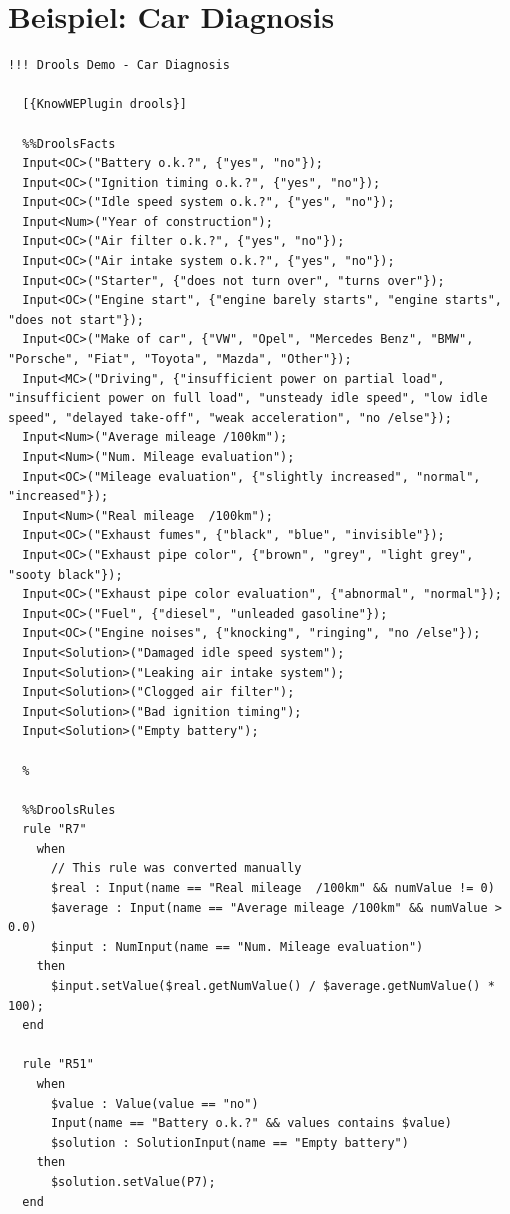 \documentclass[a4paper,12pt]{report}
\begin{document}
  \chapter{Beispiel: Car Diagnosis}
  \begin{lstlisting}[]
  !!! Drools Demo - Car Diagnosis

  [{KnowWEPlugin drools}]

  %%DroolsFacts
  Input<OC>("Battery o.k.?", {"yes", "no"});
  Input<OC>("Ignition timing o.k.?", {"yes", "no"});
  Input<OC>("Idle speed system o.k.?", {"yes", "no"});
  Input<Num>("Year of construction");
  Input<OC>("Air filter o.k.?", {"yes", "no"});
  Input<OC>("Air intake system o.k.?", {"yes", "no"});
  Input<OC>("Starter", {"does not turn over", "turns over"});
  Input<OC>("Engine start", {"engine barely starts", "engine starts", "does not start"});
  Input<OC>("Make of car", {"VW", "Opel", "Mercedes Benz", "BMW", "Porsche", "Fiat", "Toyota", "Mazda", "Other"});
  Input<MC>("Driving", {"insufficient power on partial load", "insufficient power on full load", "unsteady idle speed", "low idle speed", "delayed take-off", "weak acceleration", "no /else"});
  Input<Num>("Average mileage /100km");
  Input<Num>("Num. Mileage evaluation");
  Input<OC>("Mileage evaluation", {"slightly increased", "normal", "increased"});
  Input<Num>("Real mileage  /100km");
  Input<OC>("Exhaust fumes", {"black", "blue", "invisible"});
  Input<OC>("Exhaust pipe color", {"brown", "grey", "light grey", "sooty black"});
  Input<OC>("Exhaust pipe color evaluation", {"abnormal", "normal"});
  Input<OC>("Fuel", {"diesel", "unleaded gasoline"});
  Input<OC>("Engine noises", {"knocking", "ringing", "no /else"});
  Input<Solution>("Damaged idle speed system");
  Input<Solution>("Leaking air intake system");
  Input<Solution>("Clogged air filter");
  Input<Solution>("Bad ignition timing");
  Input<Solution>("Empty battery");

  %

  %%DroolsRules
  rule "R7"
    when
      // This rule was converted manually
      $real : Input(name == "Real mileage  /100km" && numValue != 0)
      $average : Input(name == "Average mileage /100km" && numValue > 0.0)
      $input : NumInput(name == "Num. Mileage evaluation")
    then
      $input.setValue($real.getNumValue() / $average.getNumValue() * 100);
  end

  rule "R51"
    when
      $value : Value(value == "no")
      Input(name == "Battery o.k.?" && values contains $value)
      $solution : SolutionInput(name == "Empty battery")
    then
      $solution.setValue(P7);
  end


\end{lstlisting}
\end{document}
